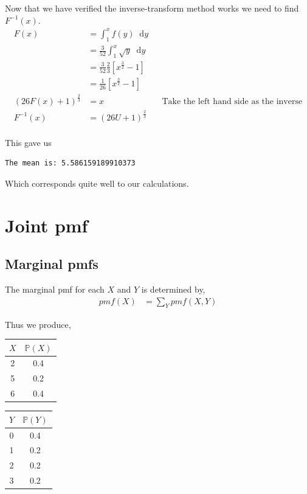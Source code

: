 \documentclass{article}
\newcommand{\diff}{\mathop{}\!\mathrm{d}}
\newcommand{\prob}{\mathbb{P}}
\begin{document}
Now that we have verified the inverse-transform method works we need to find
$F^{-1}(x)$.
\begin{align*}
    F(x) &= \int_1^x f(y) \diff y \\
    &= \frac{3}{52}\int_1^x \sqrt{y} \diff y \\
    &= \frac{3}{52}\frac{2}{3}\left[x^{\frac{3}{2}} - 1\right] \\
    &= \frac{1}{26}\left[x^{\frac{3}{2}} - 1\right] \\
    \left(26F(x) + 1\right)^{\frac{2}{3}} &= x
    && \text{Take the left hand side as the inverse} \\
    F^{-1}(x) &= \left(26U + 1\right)^{\frac{2}{3}} \\
\end{align*}



This gave us
\begin{verbatim}
The mean is: 5.586159189910373
\end{verbatim}

Which corresponds quite well to our calculations.

\section{Joint pmf}
\subsection{Marginal pmfs}
The marginal pmf for each $X$ and $Y$ is determined by,
\begin{align*}
    pmf(X) &= \sum_Y pmf(X, Y)
\end{align*}

Thus we produce,
\begin{center}
\begin{tabular}{ |c|c| }
    \hline
    $X$ & $\prob(X)$ \\
    \hline
    2 & 0.4 \\
    5 & 0.2 \\
    6 & 0.4 \\
    \hline
\end{tabular}
\end{center}

\begin{center}
\begin{tabular}{ |c|c| }
    \hline
    $Y$ & $\prob(Y)$ \\
    \hline
    0 & 0.4 \\
    1 & 0.2 \\
    2 & 0.2 \\
    3 & 0.2 \\
    \hline
\end{tabular}
\end{center}
\end{document}
